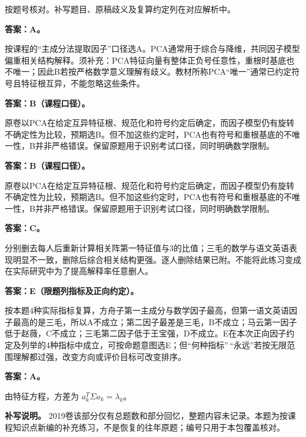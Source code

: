 \begin{keyidea}[核对方式]按题号核对。补写题目、原稿歧义及复算约定列在对应解析中。\end{keyidea}


\textbf{答案：A。}

按课程的``主成分法提取因子''口径选A。PCA通常用于综合与降维，共同因子模型偏重相关结构解释。须补充：PCA特征向量有整体正负号任意性，重根时基底也不唯一；因此B若按严格数学意义理解有歧义。教材所称PCA``唯一''通常已约定符号且特征根互异，不能忽略这些条件。



\textbf{答案：B（课程口径）。}

原卷以PCA在给定互异特征根、规范化和符号约定后确定，而因子模型仍有旋转不确定性为比较，预期选B。但不加这些约定时，PCA也有符号和重根基底的不唯一性，B并非严格错误。保留原题用于识别考试口径，同时明确数学限制。



\textbf{答案：B（课程口径）。}

原卷以PCA在给定互异特征根、规范化和符号约定后确定，而因子模型仍有旋转不确定性为比较，预期选B。但不加这些约定时，PCA也有符号和重根基底的不唯一性，B并非严格错误。保留原题用于识别考试口径，同时明确数学限制。



\textbf{答案：C。}

分别删去每人后重新计算相关阵第一特征值与3的比值；三毛的数学与语文英语表现明显不一致，删除后综合相关结构更强。逐人删除结果已附。不能将此练习变成在实际研究中为了提高解释率任意删人。



\textbf{答案：E（限题列指标及正向约定）。}

按本题4种实际指标复算，方舟子第一主成分与数学因子最高，但第一语文英语因子最高的是三毛，所以A不成立；第二因子最差是三毛，B不成立；马云第一因子低于赵薇，C不成立；三毛第二因子低于王宝强，D不成立。E在本次正向因子约定及列举的4种指标中成立，可按命题意图选E；但``何种指标''\,``永远''若按无限范围理解都过强，改变方向或评价目标可改变排序。



\textbf{答案：A。}

由特征方程，方差为 \(a_k^T\Sigma a_k=\lambda_k\)。


\textbf{补写说明。} 2019卷该部分仅有总题数和部分回忆，整题内容未记录。本题为按课程知识点新编的补充练习，不是恢复的往年原题；编号只用于本包覆盖核对。


